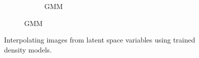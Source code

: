 \begin{figure}
\begin{floatrow}
{\begin{subfigure}[t]{0.45\textwidth}
\begin{subfigure}[t]{0.49\textwidth}
			\caption{GMM}
			\label{fig:gmm:interpolation}
		\end{subfigure}	
	\end{subfigure}
	}{%
	\caption{Interpolating images from latent space variables using trained density models.}
	}
\end{floatrow}
\end{figure}
